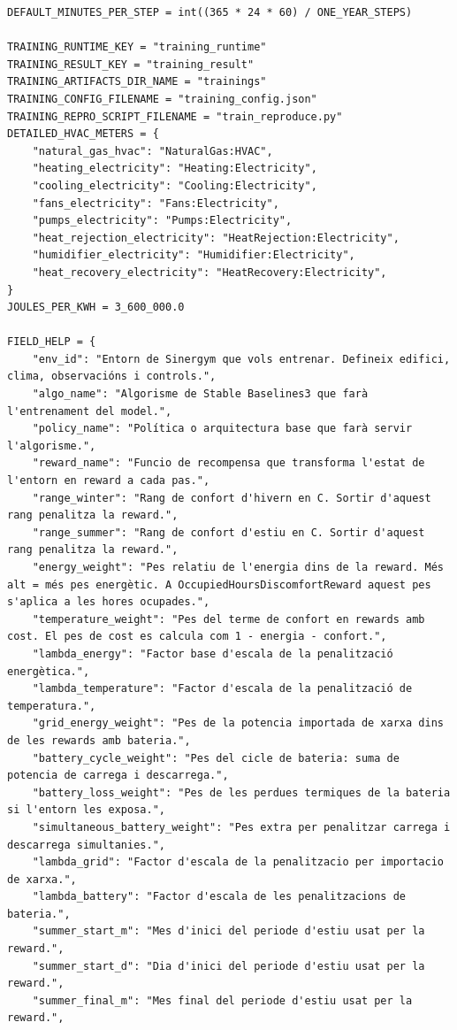 \documentclass[10pt,a4paper]{article}
\begin{document}
\begin{lstlisting}[style=studioPython,caption={backend/entrenar\_agent\_constants.py},label={lst:backend-entrenar-agent-constants-py}]
DEFAULT_MINUTES_PER_STEP = int((365 * 24 * 60) / ONE_YEAR_STEPS)

TRAINING_RUNTIME_KEY = "training_runtime"
TRAINING_RESULT_KEY = "training_result"
TRAINING_ARTIFACTS_DIR_NAME = "trainings"
TRAINING_CONFIG_FILENAME = "training_config.json"
TRAINING_REPRO_SCRIPT_FILENAME = "train_reproduce.py"
DETAILED_HVAC_METERS = {
    "natural_gas_hvac": "NaturalGas:HVAC",
    "heating_electricity": "Heating:Electricity",
    "cooling_electricity": "Cooling:Electricity",
    "fans_electricity": "Fans:Electricity",
    "pumps_electricity": "Pumps:Electricity",
    "heat_rejection_electricity": "HeatRejection:Electricity",
    "humidifier_electricity": "Humidifier:Electricity",
    "heat_recovery_electricity": "HeatRecovery:Electricity",
}
JOULES_PER_KWH = 3_600_000.0

FIELD_HELP = {
    "env_id": "Entorn de Sinergym que vols entrenar. Defineix edifici, clima, observacións i controls.",
    "algo_name": "Algorisme de Stable Baselines3 que farà l'entrenament del model.",
    "policy_name": "Política o arquitectura base que farà servir l'algorisme.",
    "reward_name": "Funcio de recompensa que transforma l'estat de l'entorn en reward a cada pas.",
    "range_winter": "Rang de confort d'hivern en C. Sortir d'aquest rang penalitza la reward.",
    "range_summer": "Rang de confort d'estiu en C. Sortir d'aquest rang penalitza la reward.",
    "energy_weight": "Pes relatiu de l'energia dins de la reward. Més alt = més pes energètic. A OccupiedHoursDiscomfortReward aquest pes s'aplica a les hores ocupades.",
    "temperature_weight": "Pes del terme de confort en rewards amb cost. El pes de cost es calcula com 1 - energia - confort.",
    "lambda_energy": "Factor base d'escala de la penalització energètica.",
    "lambda_temperature": "Factor d'escala de la penalització de temperatura.",
    "grid_energy_weight": "Pes de la potencia importada de xarxa dins de les rewards amb bateria.",
    "battery_cycle_weight": "Pes del cicle de bateria: suma de potencia de carrega i descarrega.",
    "battery_loss_weight": "Pes de les perdues termiques de la bateria si l'entorn les exposa.",
    "simultaneous_battery_weight": "Pes extra per penalitzar carrega i descarrega simultanies.",
    "lambda_grid": "Factor d'escala de la penalitzacio per importacio de xarxa.",
    "lambda_battery": "Factor d'escala de les penalitzacions de bateria.",
    "summer_start_m": "Mes d'inici del periode d'estiu usat per la reward.",
    "summer_start_d": "Dia d'inici del periode d'estiu usat per la reward.",
    "summer_final_m": "Mes final del periode d'estiu usat per la reward.",

\end{lstlisting}
\end{document}
